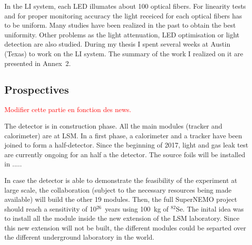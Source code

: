 \documentclass[main.tex]{subfiles}
\begin{document}
\NI In  the  LI  system,  each  LED  illumates  about  100  optical  fibers. For  linearity  tests  and  for  proper  monitoring  accuracy  the  light  receiced  for  each  optical  fibers  has  to  be  uniform. Many  studies  have  been  realized  in  the  past  to  obtain  the best  uniformity. Other problems as the light attenuation, LED optimisation or light detection are also studied. During my thesis I spent several weeks at Austin (Texas) to work on the LI system. The summary of the work I realized on it are presented in Annex~2.


\FloatBarrier


\subsection{Prospectives}

\NI \textcolor{red}{Modifier cette partie en fonction des news.}

\NI The detector is in construction phase. All the main modules (tracker and calorimeter) are at LSM. In a first phase, a calorimeter and a tracker have been joined to form a half-detector. Since the beginning of 2017, light and gas leak test are currently ongoing for an half a the detector. The source foils will be installed in .....


\bigskip


\NI In case the detector is able to demonstrate the feasibility of the experiment at large scale, the collaboration (subject to the necessary resources being made available) will build the other 19 modules. Then, the full SuperNEMO project should reach a sensitivity of 10$^{\text{26}}$~years using 100~kg of $^{\text{82}}$Se. The inital idea was to install all the module inside the new extension of the LSM laboratory. Since this new extension will not be built, the different modules could be separted over the different underground laboratory in the world. 
\end{document}
